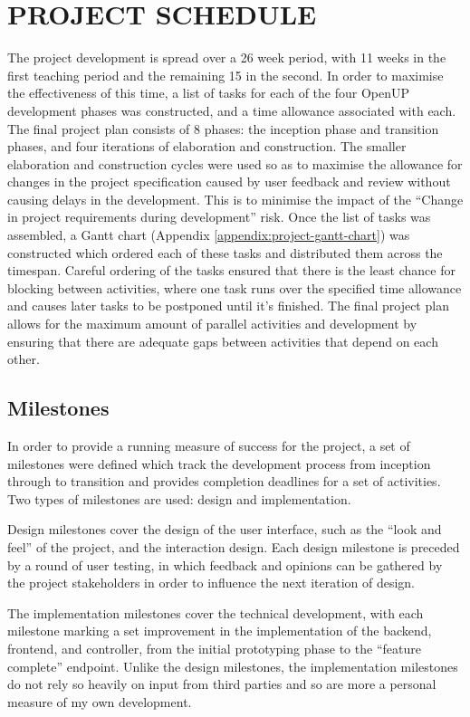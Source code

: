 \section{PROJECT SCHEDULE \hrulefill}
The project development is spread over a 26 week period, with 11 weeks in the
first teaching period and the remaining 15 in the second. In order to maximise
the effectiveness of this time, a list of tasks for each of the four OpenUP
development phases was constructed, and a time allowance associated with
each. The final project plan consists of 8 phases: the inception phase and
transition phases, and four iterations of elaboration and construction.  The
smaller elaboration and construction cycles were used so as to maximise the
allowance for changes in the project specification caused by user feedback and
review without causing delays in the development. This is to minimise the impact
of the ``Change in project requirements during development'' risk. Once the list
of tasks was assembled, a Gantt chart (Appendix
\ref{appendix:project-gantt-chart}) was constructed which ordered each of these
tasks and distributed them across the timespan. Careful ordering of the tasks
ensured that there is the least chance for blocking between activities, where
one task runs over the specified time allowance and causes later tasks to be
postponed until it's finished.  The final project plan allows for the maximum
amount of parallel activities and development by ensuring that there are
adequate gaps between activities that depend on each other.

\subsection{Milestones}
In order to provide a running measure of success for the project, a set of
milestones were defined which track the development process from inception
through to transition and provides completion deadlines for a set of activities.
Two types of milestones are used: design and implementation.

Design milestones cover the design of the user interface, such as the ``look and
feel'' of the project, and the interaction design. Each design milestone is
preceded by a round of user testing, in which feedback and opinions can be
gathered by the project stakeholders in order to influence the next iteration of
design.

The implementation milestones cover the technical development, with each
milestone marking a set improvement in the implementation of the backend,
frontend, and controller, from the initial prototyping phase to the ``feature
complete'' endpoint. Unlike the design milestones, the implementation milestones
do not rely so heavily on input from third parties and so are more a personal
measure of my own development.

